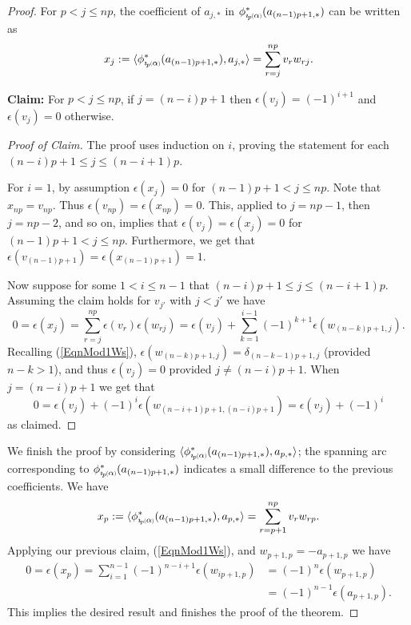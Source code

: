 \documentclass[11pt]{amsart}
\newcommand*{\subsmallp}[1]{\scalebox{.5}{\ensuremath#1}}
\newcommand{\subpp}[2][p]{\imath_{\hspace*{-1pt}#1}\hspace*{-.5pt}\subsmallp(#2\subsmallp)}
\theoremstyle{definition}
\begin{document}
\begin{proof}
For $p<j\le np$, the coefficient of $a_{j,\ast}$ in $\phi^\ast_{\subpp\alpha}(a_{(n-1)p+1,\ast})$ can be written as
      \begin{equation}x_j := \langle \phi^{\ast}_{\subpp\alpha}(a_{(n-1)p+1,\ast}), a_{j,\ast} \rangle = \sum_{r=j}^{np}v_rw_{rj}.
      \label{eqnCurveExpansion}
      \end{equation}

{\bf Claim:} For $p < j \le np$, if $j=(n-i)p+1$ then $\epsilon(v_j)=(-1)^{i+1}$ and $\epsilon(v_j)=0$ otherwise.
\begin{proof}[Proof of Claim] The proof uses induction on $i$, proving the statement for each $(n-i)p+1\le j\le (n-i+1)p$. 

For $i=1$, by assumption $\epsilon(x_j)=0$ for $(n-1)p+1<j\le np$. Note that $x_{np} = v_{np}$. Thus $\epsilon(v_{np})=\epsilon(x_{np}) = 0$. This, applied to $j=np-1$, then $j=np-2$, and so on, implies that $\epsilon(v_j) = \epsilon(x_j) = 0$ for $(n-1)p+1<j\le np$. Furthermore, we get that $\epsilon(v_{(n-1)p+1}) = \epsilon(x_{(n-1)p+1}) = 1$.

Now suppose for some $1<i\le n-1$ that $(n-i)p+1\le j \le (n-i+1)p$. Assuming the claim holds for $v_{j'}$ with $j<j'$ we have
      \[0 = \epsilon(x_j) = \sum_{r=j}^{np}\epsilon(v_r)\epsilon(w_{rj}) = \epsilon(v_j) + \sum_{k=1}^{i-1}(-1)^{k+1}\epsilon(w_{(n-k)p+1,j}).\]
Recalling (\ref{EqnMod1Ws}), $\epsilon(w_{(n-k)p+1,j})=\delta_{(n-k-1)p+1,j}$ (provided $n-k>1$), and thus $\epsilon(v_j) = 0$ provided $j\ne (n-i)p+1$. When $j=(n-i)p+1$ we get that 
      \[0 = \epsilon(v_j) + (-1)^{i}\epsilon(w_{(n-i+1)p+1,(n-i)p+1}) = \epsilon(v_j) + (-1)^{i}\]
\noindent as claimed.
\end{proof}

We finish the proof by considering $\langle \phi^{\ast}_{\subpp\alpha}(a_{(n-1)p+1,\ast}), a_{p,\ast} \rangle$; the spanning arc corresponding to $\phi^{\ast}_{\subpp\alpha}(a_{(n-1)p+1,\ast})$ indicates a small difference to the previous coefficients. We have
      \[x_p := \langle \phi^{\ast}_{\subpp\alpha}(a_{(n-1)p+1,\ast}), a_{p,\ast} \rangle = \sum_{r=p+1}^{np}v_rw_{rp}.\]
Applying our previous claim, (\ref{EqnMod1Ws}), and $w_{p+1,p}=-a_{p+1,p}$ we have
        \begin{align*}
        0 = \epsilon(x_p)   = \sum_{i=1}^{n-1}(-1)^{n-i+1}\epsilon(w_{ip+1,p})  &= (-1)^n\epsilon(w_{p+1,p})\\
                                                                                &= (-1)^{n-1}\epsilon(a_{p+1,p}).
        \end{align*}
This implies the desired result and finishes the proof of the theorem. 
\end{proof}
\end{document}
